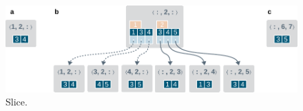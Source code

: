 \begin{figure}[h]
	\centering
	\includegraphics{figures/chapter2/hypertrie4_slices}
	\caption{Slice.}
	\label{fig:rdf_hypertrie_slice}
\end{figure}
\clearpage